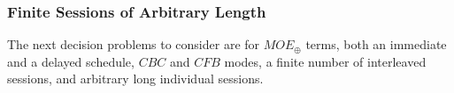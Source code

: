 \documentclass{llncs}
\begin{document}
\subsubsection{Finite Sessions of Arbitrary Length}
The next decision problems to consider are for $MOE_{\oplus}$ terms,
both an immediate and a delayed schedule, $CBC$ and $CFB$ modes, a
finite number of interleaved sessions, and arbitrary long individual
sessions.    
 
\end{document}
